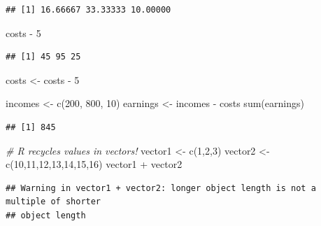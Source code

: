 \documentclass[
]{book}
\newenvironment{Shaded}{\begin{snugshade}}{\end{snugshade}}
\newcommand{\CommentTok}[1]{\textcolor[rgb]{0.56,0.35,0.01}{\textit{#1}}}
\newcommand{\DecValTok}[1]{\textcolor[rgb]{0.00,0.00,0.81}{#1}}
\newcommand{\FunctionTok}[1]{\textcolor[rgb]{0.00,0.00,0.00}{#1}}
\newcommand{\NormalTok}[1]{#1}
\newcommand{\OtherTok}[1]{\textcolor[rgb]{0.56,0.35,0.01}{#1}}
\newcommand{\SpecialCharTok}[1]{\textcolor[rgb]{0.00,0.00,0.00}{#1}}
\begin{document}
\begin{verbatim}
## [1] 16.66667 33.33333 10.00000
\end{verbatim}

\begin{Shaded}
\begin{Highlighting}[]
\NormalTok{costs }\SpecialCharTok{{-}} \DecValTok{5}
\end{Highlighting}
\end{Shaded}

\begin{verbatim}
## [1] 45 95 25
\end{verbatim}

\begin{Shaded}
\begin{Highlighting}[]
\NormalTok{costs }\OtherTok{\textless{}{-}}\NormalTok{ costs }\SpecialCharTok{{-}} \DecValTok{5}

\NormalTok{incomes }\OtherTok{\textless{}{-}} \FunctionTok{c}\NormalTok{(}\DecValTok{200}\NormalTok{, }\DecValTok{800}\NormalTok{, }\DecValTok{10}\NormalTok{)}
\NormalTok{earnings }\OtherTok{\textless{}{-}}\NormalTok{ incomes }\SpecialCharTok{{-}}\NormalTok{ costs}
\FunctionTok{sum}\NormalTok{(earnings)}
\end{Highlighting}
\end{Shaded}

\begin{verbatim}
## [1] 845
\end{verbatim}

\begin{Shaded}
\begin{Highlighting}[]
\CommentTok{\# R recycles values in vectors!}
\NormalTok{vector1 }\OtherTok{\textless{}{-}} \FunctionTok{c}\NormalTok{(}\DecValTok{1}\NormalTok{,}\DecValTok{2}\NormalTok{,}\DecValTok{3}\NormalTok{)}
\NormalTok{vector2 }\OtherTok{\textless{}{-}} \FunctionTok{c}\NormalTok{(}\DecValTok{10}\NormalTok{,}\DecValTok{11}\NormalTok{,}\DecValTok{12}\NormalTok{,}\DecValTok{13}\NormalTok{,}\DecValTok{14}\NormalTok{,}\DecValTok{15}\NormalTok{,}\DecValTok{16}\NormalTok{)}
\NormalTok{vector1 }\SpecialCharTok{+}\NormalTok{ vector2}
\end{Highlighting}
\end{Shaded}

\begin{verbatim}
## Warning in vector1 + vector2: longer object length is not a multiple of shorter
## object length
\end{verbatim}
\end{document}
